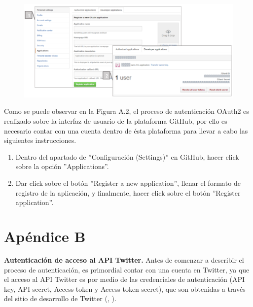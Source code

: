 \begin{enumerate}[1.]
        \begin{figure}[H]
            \centering
            \includegraphics[height=0.25\textheight]{oauth2_git}
            \label{fig:RHP02}
        \end{figure}
        
Como se puede observar en la Figura A.2, el proceso de autenticación OAuth2 es realizado sobre la interfaz de usuario de la plataforma GitHub, por ello es necesario contar con una cuenta dentro de ésta plataforma para llevar a cabo las siguientes instrucciones.

\begin{enumerate}[1.]
\item Dentro del apartado de ''Configuración (Settings)'' en GitHub, hacer click sobre la opción ''Applications''.
\item Dar click sobre el botón ''Register a new application'', llenar el formato de registro de la aplicación, y finalmente, hacer click sobre el botón ''Register application''.
\end{enumerate}

    
\end{enumerate}


\chapter{Apéndice B}
\label{app:app02}
%
%
\textbf{Autenticación de acceso al API Twitter.} Antes de comenzar a describir el proceso de autenticación, es primordial contar con una cuenta en Twitter, ya que el acceso al API Twitter es por medio de las credenciales de autenticación (API key, API secret, Access token y Access token secret), que son obtenidas a través del sitio de desarrollo de Twitter (\citeauthor{oauth_twitter}, \citeyear{oauth_twitter}).

